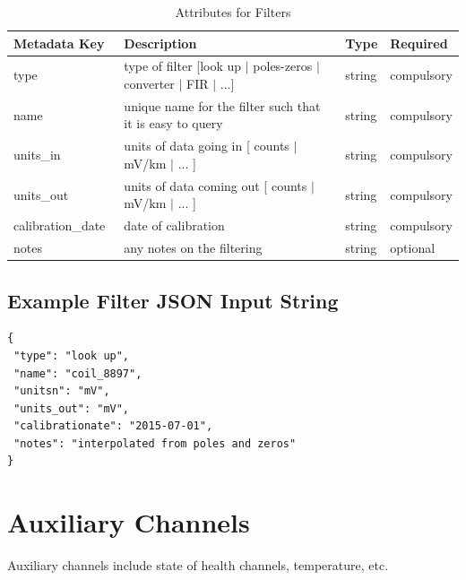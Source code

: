 \documentclass{article}
\begin{document}
\begin{table}[htb!]
    \caption[Attributes for Filter]{Attributes for Filters}
    \begin{tabular}{|l|p{3.5in}|l|l|}
        \hline
        \textbf{Metadata Key} & \textbf{Description} & \textbf{Type} & \textbf{Required} \\ \hline
        type\ & type of filter [look up $|$ poles-zeros $|$ converter $|$ FIR $|$ ...]& string &  compulsory \\ \hline
        name\ & unique name for the filter such that it is easy to query & string & compulsory \\ \hline
        units\_in\ & units of data going in [ counts $|$ mV/km $|$ ... ] & string & compulsory \\ \hline
        units\_out\ & units of data coming out [ counts $|$ mV/km $|$ ... ] & string & compulsory \\ \hline
        calibration\_date\ & date of calibration & string &  compulsory \\ \hline
        notes\ & any notes on the filtering & string &  optional \\ \hline
    \end{tabular}
    \label{tab:filter}
\end{table}

\subsection{Example Filter JSON Input String} 

\begin{verbatim}
{
 "type": "look up",
 "name": "coil_8897",
 "unitsn": "mV",
 "units_out": "mV",
 "calibrationate": "2015-07-01",
 "notes": "interpolated from poles and zeros"
}
\end{verbatim}

\newpage

\section{Auxiliary Channels}

Auxiliary channels include state of health channels, temperature, etc.  
\end{document}
